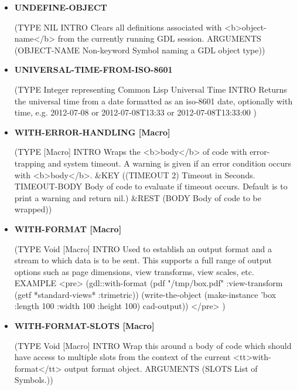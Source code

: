 \documentclass [11pt]{book}
\begin{document}
\begin{itemize}
\item {}
\label{prim:undefine-object}
\textbf{UNDEFINE-OBJECT}

(TYPE NIL INTRO  Clears all definitions associated with <b>object-name</b> from the
currently running GDL session.
 ARGUMENTS (OBJECT-NAME Non-keyword Symbol naming a GDL object type))



\item {}
\label{prim:universal-time-from-iso-8601}
\textbf{UNIVERSAL-TIME-FROM-ISO-8601}

(TYPE Integer representing Common Lisp Universal Time INTRO  Returns the universal time from a date formatted as
an iso-8601 date, optionally with time, e.g. 2012-07-08 or 2012-07-08T13:33 or 2012-07-08T13:33:00
)



\item {}
\label{prim:with-error-handling}
\textbf{WITH-ERROR-HANDLING [Macro]}

(TYPE [Macro] INTRO  Wraps the <b>body</b> of code with error-trapping and system timeout.
A warning is given if an error condition occurs with <b>body</b>.
 \&KEY ((TIMEOUT 2) Timeout in Seconds. TIMEOUT-BODY Body of code to evaluate if timeout occurs.
Default is to print a warning and return nil.) \&REST (BODY Body of code to be wrapped))



\item {}
\label{prim:with-format}
\textbf{WITH-FORMAT [Macro]}

(TYPE Void [Macro] INTRO  Used to establish an output format and a stream to which data is to be sent. This
supports a full range of output options such as page dimensions, view transforms, view scales, etc.
 EXAMPLE 
<pre>
 (gdl::with-format (pdf "/tmp/box.pdf" :view-transform (getf *standard-views* :trimetric)) 
    (write-the-object (make-instance 'box :length 100 :width 100 :height 100) cad-output))
</pre>
)



\item {}
\label{prim:with-format-slots}
\textbf{WITH-FORMAT-SLOTS [Macro]}

(TYPE Void [Macro] INTRO  Wrap this around a body of code which should have access to multiple slots from the context
of the current <tt>with-format</tt> output format object.
 ARGUMENTS (SLOTS List of Symbols.))




\end{itemize}
\end{document}
